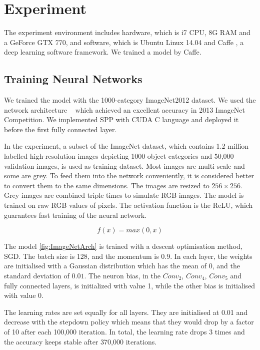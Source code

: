 
\chapter{Experiment} %
\label{Chapter4}

The experiment environment includes hardware, which is i7 CPU, 8G RAM and a GeForce GTX 770, and software, which is Ubuntu Linux 14.04 and Caffe \citep{jia2014caffe}, a deep learning software framework. We trained a model by Caffe.

\section{Training Neural Networks}

We trained the model with the 1000-category ImageNet2012 dataset. We used the network architecture ~\cite{ZeilerF13} which achieved an excellent accuracy in 2013 ImageNet Competition. We implemented SPP with CUDA C language and deployed it before the first fully connected layer.

In the experiment, a subset of the ImageNet dataset, which contains 1.2 million labelled high-resolution images depicting 1000 object categories and 50,000 validation images, is used as training dataset. Most images are multi-scale and some are grey. To feed them into the network conveniently, it is considered better to convert them to the same dimensions. The images are resized to $256\times256$. Grey images are combined triple times to simulate RGB images. The model is trained on raw RGB values of pixels. The activation function is the ReLU, which guarantees fast training of the neural network.

\begin{equation}\label{eq:ReLU}
f(x) = max(0, x)
\end{equation}

The model \ref{fig:ImageNetArch} is trained with a descent optimisation method, SGD. The batch size is 128, and the momentum is 0.9.  In each layer, the weights are initialised with a Gaussian distribution which has the mean of $0$, and the standard deviation of $0.01$. The neuron bias, in the $Conv_{2}$, $Conv_{4}$, $Conv_{5}$ and fully connected layers, is initialized with value 1, while the other bias is initialised with value 0.

The learning rates are set equally for all layers. They are initialised at 0.01 and decrease with the stepdown policy which means that they would drop by a factor of 10 after each 100,000 iteration. In total, the learning rate drops 3 times and the accuracy keeps stable after 370,000 iterations. 

